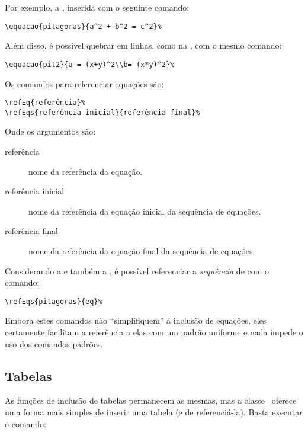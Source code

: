 Por exemplo, a , inserida com o seguinte comando:
\begin{verbatim}
\equacao{pitagoras}{a^2 + b^2 = c^2}%
\end{verbatim}

%

Além disso, é possível quebrar em linhas, como na , com o mesmo comando:
\begin{verbatim}
\equacao{pit2}{a = (x+y)^2\\b= (x*y)^2}%
\end{verbatim}

%

Os comandos para referenciar equações são:

\begin{verbatim}
\refEq{referência}%
\refEqs{referência inicial}{referência final}%
\end{verbatim}

Onde os argumentos são:
\begin{description}
	\item[referência] nome da referência da equação.
	\item[referência inicial] nome da referência da equação inicial da sequência de equações.
	\item[referência final] nome da referência da equação final da sequência de equações.
\end{description}

Considerando a  e também a , é possível referenciar a \emph{sequência} 
de  com o comando:
\begin{verbatim}
\refEqs{pitagoras}{eq}%
\end{verbatim}

Embora estes comandos não ``simplifiquem'' a inclusão de equações, eles certamente facilitam a 
referência a elas com um padrão uniforme e nada impede o uso dos comandos padrões.

%


\subsection{Tabelas}
As funções de inclusão de tabelas permanecem as mesmas, mas a classe \unbene\ oferece uma forma 
mais simples de inserir uma tabela (e de referenciá-la). Basta executar o comando:

